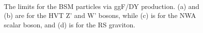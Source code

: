\begin{figure}[ht]
	\centering
	\\
	\caption{The limits for the BSM particles via ggF/DY production. (a) and (b) are for the HVT Z' and W' bosons, while (c) is for the NWA scalar boson, and (d) is for the RS graviton.}
	\label{Fig:limit_ggF}
\end{figure}
